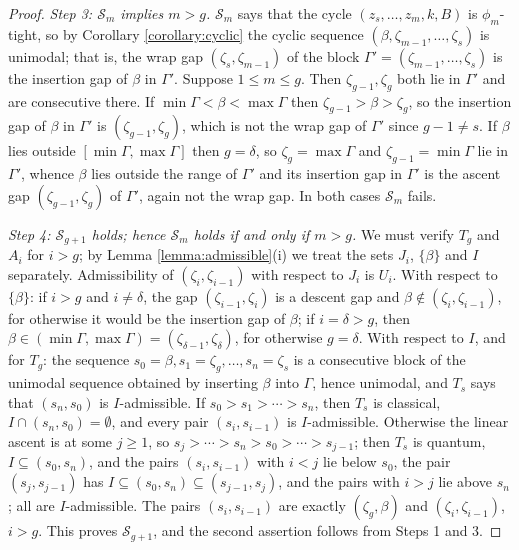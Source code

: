 \documentclass{amsart}
\theoremstyle{definition}
\theoremstyle{remark}
\numberwithin{equation}{section}
\begin{document}
\begin{proof}
\emph{Step 3: $\mathcal S_m$ implies $m>g$.} $\mathcal S_m$ says that the cycle $(z_s,\ldots,z_m,k,B)$ is $\phi_m$-tight, so by Corollary \ref{corollary:cyclic} the cyclic sequence $(\beta,\zeta_{m-1},\ldots,\zeta_s)$ is unimodal; that is, the wrap gap $(\zeta_s,\zeta_{m-1})$ of the block $\Gamma'=(\zeta_{m-1},\ldots,\zeta_s)$ is the insertion gap of $\beta$ in $\Gamma'$. Suppose $1\leq m\leq g$. Then $\zeta_{g-1},\zeta_g$ both lie in $\Gamma'$ and are consecutive there. If $\min\Gamma<\beta<\max\Gamma$ then $\zeta_{g-1}>\beta>\zeta_g$, so the insertion gap of $\beta$ in $\Gamma'$ is $(\zeta_{g-1},\zeta_g)$, which is not the wrap gap of $\Gamma'$ since $g-1\neq s$. If $\beta$ lies outside $[\min\Gamma,\max\Gamma]$ then $g=\delta$, so $\zeta_g=\max\Gamma$ and $\zeta_{g-1}=\min\Gamma$ lie in $\Gamma'$, whence $\beta$ lies outside the range of $\Gamma'$ and its insertion gap in $\Gamma'$ is the ascent gap $(\zeta_{g-1},\zeta_g)$ of $\Gamma'$, again not the wrap gap. In both cases $\mathcal S_m$ fails.

\emph{Step 4: $\mathcal S_{g+1}$ holds; hence $\mathcal S_m$ holds if and only if $m>g$.} We must verify $T_g$ and $A_i$ for $i>g$; by Lemma \ref{lemma:admissible}(i) we treat the sets $J_i$, $\{\beta\}$ and $I$ separately. Admissibility of $(\zeta_i,\zeta_{i-1})$ with respect to $J_i$ is $U_i$. With respect to $\{\beta\}$: if $i>g$ and $i\neq\delta$, the gap $(\zeta_{i-1},\zeta_i)$ is a descent gap and $\beta\notin(\zeta_i,\zeta_{i-1})$, for otherwise it would be the insertion gap of $\beta$; if $i=\delta>g$, then $\beta\in(\min\Gamma,\max\Gamma)=(\zeta_{\delta-1},\zeta_\delta)$, for otherwise $g=\delta$. With respect to $I$, and for $T_g$: the sequence $s_0=\beta,s_1=\zeta_g,\ldots,s_n=\zeta_s$ is a consecutive block of the unimodal sequence obtained by inserting $\beta$ into $\Gamma$, hence unimodal, and $T_s$ says that $(s_n,s_0)$ is $I$-admissible. If $s_0>s_1>\cdots>s_n$, then $T_s$ is classical, $I\cap(s_n,s_0)=\emptyset$, and every pair $(s_i,s_{i-1})$ is $I$-admissible. Otherwise the linear ascent is at some $j\geq1$, so $s_j>\cdots>s_n>s_0>\cdots>s_{j-1}$; then $T_s$ is quantum, $I\subseteq(s_0,s_n)$, and the pairs $(s_i,s_{i-1})$ with $i<j$ lie below $s_0$, the pair $(s_j,s_{j-1})$ has $I\subseteq(s_0,s_n)\subseteq(s_{j-1},s_j)$, and the pairs with $i>j$ lie above $s_n$; all are $I$-admissible. The pairs $(s_i,s_{i-1})$ are exactly $(\zeta_g,\beta)$ and $(\zeta_i,\zeta_{i-1})$, $i>g$. This proves $\mathcal S_{g+1}$, and the second assertion follows from Steps 1 and 3.


\end{proof}
\end{document}
